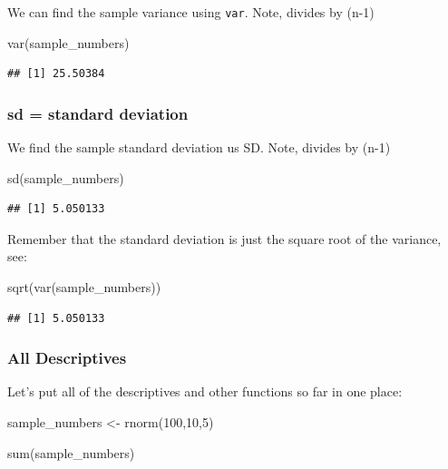 \documentclass[
]{book}
\newenvironment{Shaded}{\begin{snugshade}}{\end{snugshade}}
\newcommand{\DecValTok}[1]{\textcolor[rgb]{0.00,0.00,0.81}{#1}}
\newcommand{\FunctionTok}[1]{\textcolor[rgb]{0.00,0.00,0.00}{#1}}
\newcommand{\NormalTok}[1]{#1}
\newcommand{\OtherTok}[1]{\textcolor[rgb]{0.56,0.35,0.01}{#1}}
\begin{document}
We can find the sample variance using \texttt{var}. Note, divides by (n-1)

\begin{Shaded}
\begin{Highlighting}[]
\FunctionTok{var}\NormalTok{(sample\_numbers)}
\end{Highlighting}
\end{Shaded}

\begin{verbatim}
## [1] 25.50384
\end{verbatim}

\hypertarget{sd-standard-deviation}{%
\subsubsection{sd = standard deviation}\label{sd-standard-deviation}}

We find the sample standard deviation us SD. Note, divides by (n-1)

\begin{Shaded}
\begin{Highlighting}[]
\FunctionTok{sd}\NormalTok{(sample\_numbers)}
\end{Highlighting}
\end{Shaded}

\begin{verbatim}
## [1] 5.050133
\end{verbatim}

Remember that the standard deviation is just the square root of the variance, see:

\begin{Shaded}
\begin{Highlighting}[]
\FunctionTok{sqrt}\NormalTok{(}\FunctionTok{var}\NormalTok{(sample\_numbers))}
\end{Highlighting}
\end{Shaded}

\begin{verbatim}
## [1] 5.050133
\end{verbatim}

\hypertarget{all-descriptives}{%
\subsubsection{All Descriptives}\label{all-descriptives}}

Let's put all of the descriptives and other functions so far in one place:

\begin{Shaded}
\begin{Highlighting}[]
\NormalTok{sample\_numbers }\OtherTok{\textless{}{-}} \FunctionTok{rnorm}\NormalTok{(}\DecValTok{100}\NormalTok{,}\DecValTok{10}\NormalTok{,}\DecValTok{5}\NormalTok{)}

\FunctionTok{sum}\NormalTok{(sample\_numbers)}
\end{Highlighting}
\end{Shaded}
\end{document}
